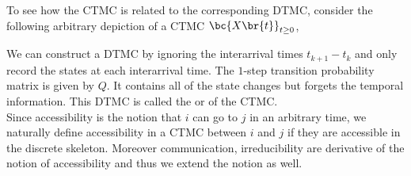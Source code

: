 \documentclass{article}
\begin{document}
    To see how the CTMC is related to the corresponding DTMC, consider the following arbitrary depiction of a CTMC $\bc{X\br{t}}_{t \geq 0}$,
    \begin{center}
    \end{center}
    We can construct a DTMC by ignoring the interarrival times $t_{k+1} - t_{k}$ and only record the states at each interarrival time. The $1$-step transition probability matrix is given by $Q$. It contains all of the state changes but forgets the temporal information. This DTMC is called the  or  of the CTMC.\\

    Since accessibility is the notion that $i$ can go to $j$ in an arbitrary time, we naturally define accessibility in a CTMC between $i$ and $j$ if they are accessible in the discrete skeleton. Moreover communication, irreducibility are derivative of the notion of accessibility and thus we extend the notion as well. \\
\end{document}
